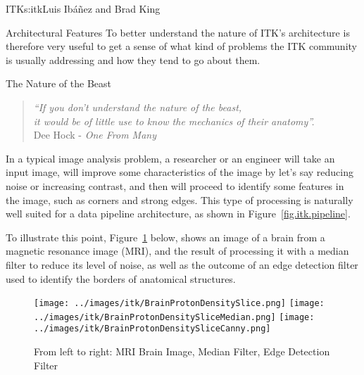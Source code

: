 \begin{aosachapter}{ITK}{s:itk}{Luis Ib\'{a}\~{n}ez and Brad King}
\begin{aosasect1}{Architectural Features}
To better understand the nature of ITK's architecture is therefore very useful
to get a sense of what kind of problems the ITK community is usually addressing
and how they tend to go about them.

\begin{aosasect2}{The Nature of the Beast}

\begin{center}
\begin{quotation}
\emph{
``If you don't understand the nature of the beast,\\
it would be of little use to know the mechanics of their anatomy''.\\
}
\hfill Dee Hock - \emph{One From Many}
\end{quotation}
\end{center}

In a typical image analysis problem, a researcher or an engineer will take an
input image, will improve some characteristics of the image by let's say
reducing noise or increasing contrast, and then will proceed to identify some
features in the image, such as corners and strong edges. This type of
processing is naturally well suited for a data pipeline architecture, as
shown in Figure~\ref{fig.itk.pipeline}.

To illustrate this point, Figure~\ref{fig.itk.brim} below, shows an image of a
brain from a magnetic resonance image (MRI), and the result of processing it
with a median filter to reduce its level of noise, as well as the outcome of an
edge detection filter used to identify the borders of anatomical structures.



%
%
%
\begin{figure}[h!]
\centering
\texttt{[image: ../images/itk/BrainProtonDensitySlice.png]}
\texttt{[image: ../images/itk/BrainProtonDensitySliceMedian.png]}
\texttt{[image: ../images/itk/BrainProtonDensitySliceCanny.png]}
\caption{From left to right: MRI Brain Image, Median Filter, Edge Detection Filter}
\label{fig.itk.brim}
\end{figure}


\end{aosasect2}
\end{aosasect1}
\end{aosachapter}
